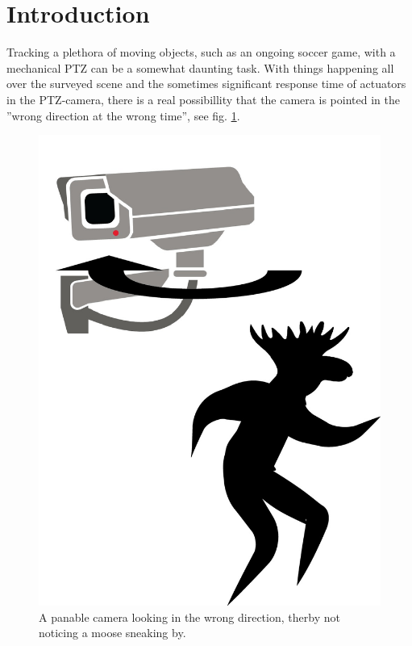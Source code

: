 \section{Introduction}


Tracking a plethora of moving objects, such as an ongoing soccer game, with a mechanical PTZ can be a somewhat daunting task. With things happening all over the surveyed scene and the sometimes significant response time of actuators in the PTZ-camera, there is a real possibillity that the camera is pointed in the ''wrong direction at the wrong time'', see fig. \ref{fig:problem}.

\begin{figure}[H]
	\centering
	\includegraphics[width=0.5 \columnwidth]{../results/images/PTZ_problem.jpg}
	\caption{A panable camera looking in the wrong direction, therby not noticing a moose sneaking by.}
	\label{fig:problem}
\end{figure}

